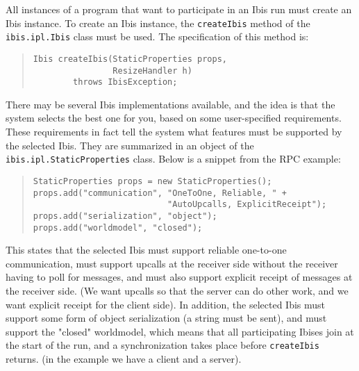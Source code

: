 \documentclass[10pt]{article}
\begin{document}
All instances of a program that want to participate in an Ibis run
must create an Ibis instance.
To create an Ibis instance, the \verb+createIbis+ method of the
\verb+ibis.ipl.Ibis+ class must be used.
The specification of this method is:
\begin{quote}
\begin{verbatim}
Ibis createIbis(StaticProperties props,
                ResizeHandler h)
        throws IbisException;
\end{verbatim}
\end{quote}
There may be several Ibis implementations available, and the
idea is that the system selects the best one for you, based on some
user-specified requirements.
These requirements in fact tell the system what features must be supported
by the selected Ibis.
They are summarized in an object of the
\verb+ibis.ipl.StaticProperties+ class.
Below is a snippet from the RPC example:
\begin{quote}
\begin{verbatim}
StaticProperties props = new StaticProperties();
props.add("communication", "OneToOne, Reliable, " + 
                           "AutoUpcalls, ExplicitReceipt");
props.add("serialization", "object");
props.add("worldmodel", "closed");
\end{verbatim}
\end{quote}
This states that the selected Ibis must support reliable one-to-one
communication, must support upcalls at the receiver side without the
receiver having to poll for messages, and must also support explicit
receipt of messages at the receiver side.
(We want upcalls so that the server can do other work, and we want
explicit receipt for the client side).
In addition, the selected Ibis must support some form of object
serialization (a string must be sent),
and must support the "closed" worldmodel, which means
that all participating Ibises join at the start of the run, and a
synchronization takes place before \verb+createIbis+ returns.
(in the example we have a client and a server).
\end{document}
